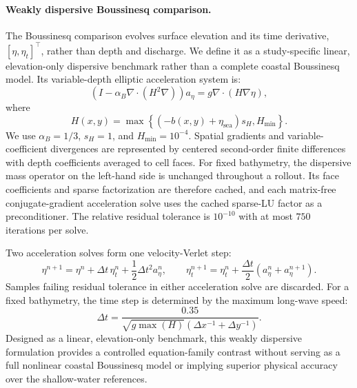 \paragraph{Weakly dispersive Boussinesq comparison.}
The Boussinesq comparison evolves surface elevation and its time derivative, $[\eta, \eta_t] ^ \top$, rather than depth and discharge. We define it as a study-specific linear, elevation-only dispersive benchmark rather than a complete coastal Boussinesq model. Its variable-depth elliptic acceleration system is:
\begin{equation}
\left(I - \alpha_B \nabla \cdot(H ^ 2 \nabla)\right) a_\eta = g \nabla \cdot(H \nabla \eta),
\end{equation}
where
\begin{equation}
H(x, y) = \max\!\left\{(-b(x, y) + \eta_{\mathrm{sea}}) s_H, H_{\min}\right\}.
\end{equation}
We use $\alpha_B = 1/3$, $s_H = 1$, and $H_{\min} = 10 ^ {-4}$. Spatial gradients and variable-coefficient divergences are represented by centered second-order finite differences with depth coefficients averaged to cell faces. For fixed bathymetry, the dispersive mass operator on the left-hand side is unchanged throughout a rollout. Its face coefficients and sparse factorization are therefore cached, and each matrix-free conjugate-gradient acceleration solve uses the cached sparse-LU factor as a preconditioner. The relative residual tolerance is $10 ^ {-10}$ with at most $750$ iterations per solve.

Two acceleration solves form one velocity-Verlet step:
\begin{equation}
\eta ^ {n + 1} = \eta ^ n + \Delta t\, \eta_t ^ n + \frac{1}{2}\Delta t ^ 2a_\eta ^ n,
\qquad
\eta_t ^ {n + 1} = \eta_t ^ n + \frac{\Delta t}{2} \left(a_\eta ^ n + a_\eta ^ {n + 1} \right).
\end{equation}
Samples failing residual tolerance in either acceleration solve are discarded. For a fixed bathymetry, the time step is determined by the maximum long-wave speed:
\begin{equation}
\Delta t = \frac{0.35}{\sqrt{g\max(H)}\left(\Delta x ^ {-1} + \Delta y ^ {-1}\right)}.
\end{equation}
Designed as a linear, elevation-only benchmark, this weakly dispersive formulation provides a controlled equation-family contrast without serving as a full nonlinear coastal Boussinesq model or implying superior physical accuracy over the shallow-water references.

